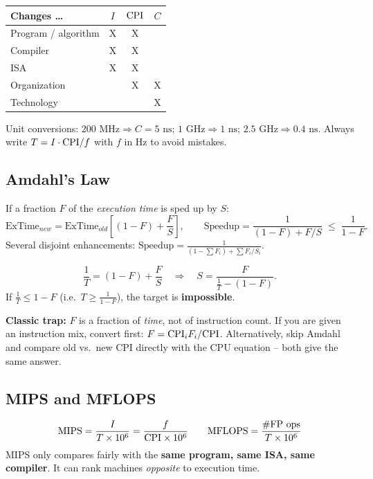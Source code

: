 \documentclass[11pt]{article}
\begin{document}
\begin{center}
\begin{tabular}{@{}lccc@{}}
\toprule
Changes \dots & $I$ & $\mathrm{CPI}$ & $C$ \\
\midrule
Program / algorithm & X & X & \\
Compiler            & X & X & \\
ISA                 & X & X & \\
Organization        &   & X & X \\
Technology          &   &   & X \\
\bottomrule
\end{tabular}
\end{center}

\begin{note}
Unit conversions: $200\text{ MHz} \Rightarrow C = 5\text{ ns}$;
$1\text{ GHz} \Rightarrow 1\text{ ns}$; $2.5\text{ GHz} \Rightarrow
0.4\text{ ns}$. Always write $T = I\cdot\mathrm{CPI} / f$ with $f$ in Hz to avoid
mistakes.
\end{note}

\subsection{Amdahl's Law}
\begin{theorem}
If a fraction $F$ of the \emph{execution time} is sped up by $S$:
\[
  \text{ExTime}_{new} = \text{ExTime}_{old}\left[(1-F)+\frac{F}{S}\right],
  \qquad
  \text{Speedup} = \frac{1}{(1-F)+F/S} \;\le\; \frac{1}{1-F}.
\]
Several disjoint enhancements:
$\displaystyle \text{Speedup} = \frac{1}{(1-\sum F_i)+\sum F_i/S_i}$.
\end{theorem}

\begin{prop}
\[
  \frac{1}{T} = (1-F) + \frac{F}{S}
  \quad\Longrightarrow\quad
  S = \frac{F}{\frac{1}{T}-(1-F)} .
\]
If $\frac{1}{T} \le 1-F$ (i.e.\ $T \ge \frac{1}{1-F}$), the target is
\textbf{impossible}.
\end{prop}

\begin{remark}
\textbf{Classic trap:} $F$ is a fraction of \emph{time}, not of instruction
count. If you are given an instruction mix, convert first:
$F = \mathrm{CPI}_i F_i / \mathrm{CPI}$. Alternatively, skip Amdahl and compare old vs.\ new
CPI directly with the CPU equation -- both give the same answer.
\end{remark}

\subsection{MIPS and MFLOPS}
\[
  \text{MIPS} = \frac{I}{T\times 10^6} = \frac{f}{\mathrm{CPI}\times10^6}
  \qquad
  \text{MFLOPS} = \frac{\#\text{FP ops}}{T\times10^6}
\]
MIPS only compares fairly with the \textbf{same program, same ISA, same
compiler}. It can rank machines \emph{opposite} to execution time.
\end{document}
